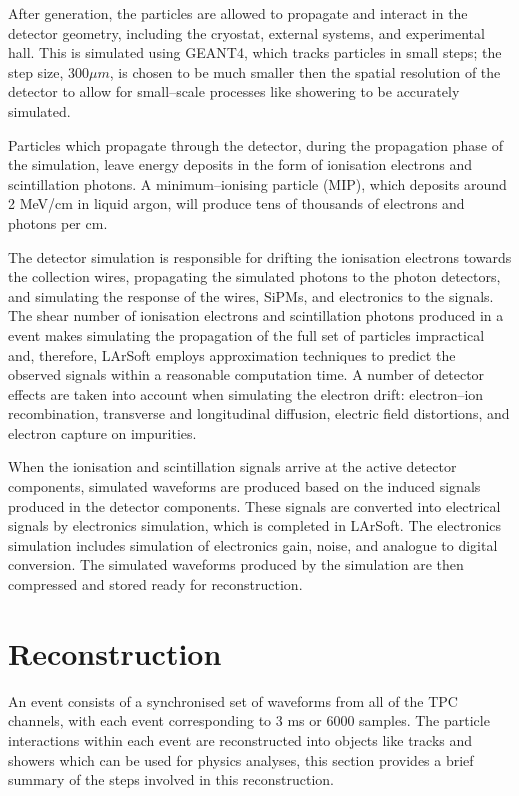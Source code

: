 After generation, the particles are allowed to propagate and interact in the 
detector geometry, including the cryostat, external systems, and experimental
hall. This is simulated using GEANT4\cite{Agostinelli:2002hh}, which tracks 
particles in small steps; the step size, $300 \mu m$, is chosen to be much 
smaller then the spatial resolution of the detector to allow for small--scale 
processes like showering to be accurately simulated. 

Particles which propagate through the detector, during the propagation phase of
the simulation, leave energy deposits in the form of ionisation electrons and
scintillation photons. A minimum--ionising particle (MIP), which deposits 
around 2 MeV/cm in liquid argon, will produce tens of thousands of electrons 
and photons per cm.

The detector simulation is responsible for drifting the ionisation electrons 
towards the collection wires, propagating the simulated photons to the photon 
detectors, and simulating the response of the wires, SiPMs, and electronics to 
the signals. The shear number of ionisation electrons and scintillation 
photons produced in a \protodune{} event makes simulating the propagation of 
the full set of particles impractical and, therefore, LArSoft employs 
approximation techniques to predict the observed signals within a reasonable 
computation time. A number of detector effects are taken into account when 
simulating the electron drift: electron--ion recombination, transverse and 
longitudinal diffusion, electric field distortions, and electron capture on 
impurities. 

When the ionisation and scintillation signals arrive at the active detector 
components, simulated waveforms are produced based on the induced signals 
produced in the detector components. These signals are converted into 
electrical signals by electronics simulation, which is completed in LArSoft. 
The electronics simulation includes simulation of electronics gain, noise, 
and analogue to digital conversion. The simulated waveforms produced by the 
\protodune{} simulation are then compressed and stored ready for reconstruction.

\section{Reconstruction} \label{sec:reconstruction}

An event consists of a synchronised set of waveforms from all of the TPC 
channels, with each event corresponding to 3 ms or 6000 samples. The particle
interactions within each event are reconstructed into objects like tracks and
showers which can be used for physics analyses, this section provides a brief 
summary of the steps involved in this reconstruction.

